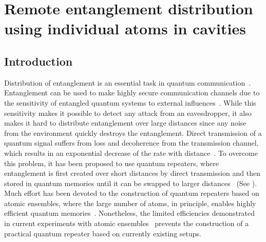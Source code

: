 \chapter{Remote entanglement distribution using individual atoms in
cavities}
\label{ch:Borregaard_PRA2015}
 

\section{Introduction}

Distribution of entanglement is an essential task in quantum
communication~\cite{kimble,cirac, acin}.  Entanglement can be used to make
highly secure communication channels due to the sensitivity of entangled quantum
systems to external influences~\cite{scarani}. While this sensitivity makes it
possible to detect any attack from an eavesdropper, it also makes it hard to
distribute entanglement over large distances since any noise from the
environment quickly destroys the entanglement. Direct transmission of a quantum signal
suffers from loss and decoherence from the transmission channel, which results
in an exponential decrease of the rate with distance~\cite{briegel}. To overcome
this problem, it has been proposed to use quantum repeaters, where entanglement
is first created over short distances by direct transmission and then stored in
quantum memories until it can be swapped to larger
distances~\cite{briegel,duan3} (See ). Much effort has been
devoted to the construction of quantum repeaters based on atomic ensembles,
where the large number of atoms, in principle, enables highly efficient quantum
memories~\cite{sangouard3,cell}. Nonetheless, the limited efficiencies
demonstrated in current experiments with atomic
ensembles~\cite{sangouard3,hammerer} prevents the construction of a practical
quantum repeater based on currently existing setups. 

